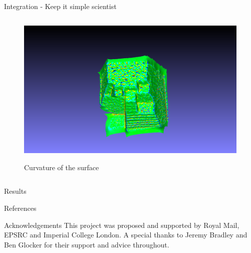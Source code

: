\documentclass{beamer}
\begin{document}
\begin{frame}{Integration -  Keep it simple scientist}
\begin{columns}
\begin{column}{0.5\textwidth}
\begin{center}
		\begin{figure}
			\includegraphics[width=0.75\linewidth]{Figures/curvature00}
			\label{curv}
			\caption{Curvature of the surface}
		\end{figure}
	\end{center}
\end{column}
\end{columns}



\end{frame}

\begin{frame}{Results}







\end{frame}




\begin{frame}{References}



\end{frame}





\begin{frame}{Acknowledgements}
This project was proposed and supported by Royal Mail, EPSRC and Imperial College London. A special thanks to Jeremy Bradley and Ben Glocker for their support and advice throughout.
\end{frame}

\end{document}
